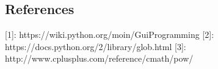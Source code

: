 \documentclass[onecolumn, draftclsnofoot,10pt, compsoc]{IEEEtran}
\begin{document}
\begin{singlespace}
		\section{References}
		
		
		[1]: https://wiki.python.org/moin/GuiProgramming
		[2]: https://docs.python.org/2/library/glob.html
		[3]: http://www.cplusplus.com/reference/cmath/pow/

		
				

		
	
	
\end{singlespace}
\end{document}

